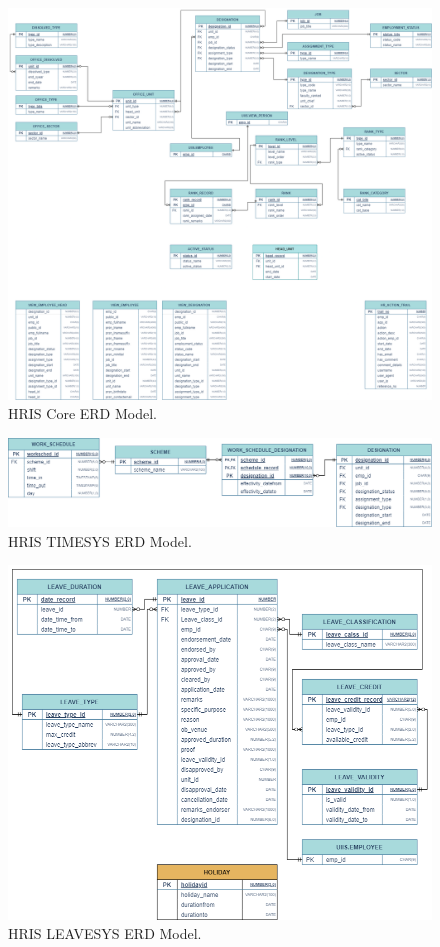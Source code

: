 \begin{figure}[H]
    \centering
    \includegraphics[width=1\linewidth]{figures/images/erd-hris.png}
    \caption{HRIS Core ERD Model.}
    \label{fig:erd-hris}
\end{figure}

\begin{figure}[H]
    \centering
    \includegraphics[width=1\linewidth]{figures/images/erd-timesys.png}
    \caption{HRIS TIMESYS ERD Model.}
    \label{fig:erd-timesys}
\end{figure}

\begin{figure}[H]
    \centering
    \includegraphics[width=1\linewidth]{figures/images/erd-leavesys.png}
    \caption{HRIS LEAVESYS ERD Model.}
    \label{fig:erd-leavesys}
\end{figure}

